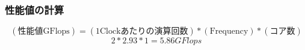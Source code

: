 \documentclass[dvipdfmx]{beamer}
\begin{document}



\begin{frame}
  \frametitle{性能値の計算}
  \begin{equation*}
		(\mbox{性能値GFlops}) = (\mbox{1Clockあたりの演算回数}) * (\mbox{Frequency}) * (\mbox{コア数})
  \end{equation*}
	\begin{equation*}
		2 * 2.93 * 1 = 5.86GFlops
  \end{equation*}

\end{frame}
\end{document}
